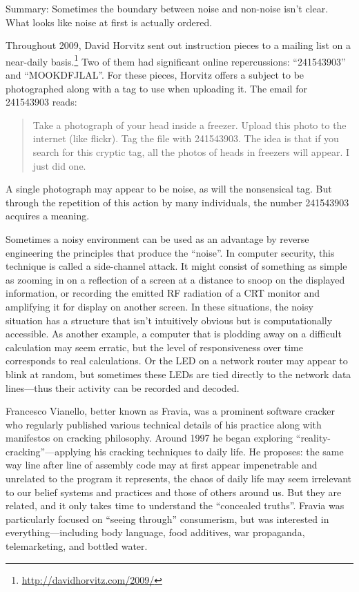 \documentclass{thesis}
\begin{document}
Summary: Sometimes the boundary between noise and non-noise isn't clear. What looks like noise at first is actually ordered.
	
Throughout 2009, David Horvitz sent out instruction pieces to a mailing list on a near-daily basis.\footnote{\url{http://davidhorvitz.com/2009/}} Two of them had significant online repercussions: ``241543903''\cite{david_horvitz_flickr:_????-1} and ``MOOKDFJLAL''\cite{david_horvitz_flickr:_????}. For these pieces, Horvitz offers a subject to be photographed along with a tag to use when uploading it. The email for 241543903 reads:
	
\begin{quote}
Take a photograph of your head inside a freezer. Upload this photo to the internet (like flickr). Tag the file with 241543903. The idea is that if you search for this cryptic tag, all the photos of heads in freezers will appear. I just did one.
\end{quote}

A single photograph may appear to be noise, as will the nonsensical tag. But through the repetition of this action by many individuals, the number 241543903 acquires a meaning.

	Sometimes a noisy environment can be used as an advantage by reverse engineering the principles that produce the ``noise''. In computer security, this technique is called a side-channel attack. It might consist of something as simple as zooming in on a reflection of a screen at a distance to snoop on the displayed information,\cite{w._wayt_gibbs_hackers_2009} or recording the emitted RF radiation of a CRT monitor and amplifying it for display on another screen.\cite{erik_thiele_tempest_????} In these situations, the noisy situation has a structure that isn't intuitively obvious but is computationally accessible. As another example, a computer that is plodding away on a difficult calculation may seem erratic, but the level of responsiveness over time corresponds to real calculations. Or the LED on a network router may appear to blink at random, but sometimes these LEDs are tied directly to the network data lines---thus their activity can be recorded and decoded.
	
	Francesco Vianello, better known as Fravia, was a prominent software cracker who regularly published various technical details of his practice along with manifestos on cracking philosophy. Around 1997 he began exploring ``reality-cracking''\cite{francesco_vianello_reality_????}---applying his cracking techniques to daily life. He proposes: the same way line after line of assembly code may at first appear impenetrable and unrelated to the program it represents, the chaos of daily life may seem irrelevant to our belief systems and practices and those of others around us. But they are related, and it only takes time to understand the ``concealed truths''. Fravia was particularly focused on ``seeing through'' consumerism, but was interested in everything---including body language, food additives, war propaganda, telemarketing, and bottled water.
	
\end{document}
